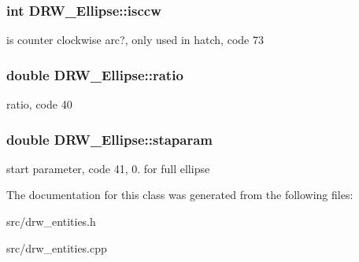 \subsubsection[{isccw}]{\setlength{\rightskip}{0pt plus 5cm}int D\+R\+W\+\_\+\+Ellipse\+::isccw}\label{class_d_r_w___ellipse_a6a8cd9de5c300fde3c52c26daf66ac77}
is counter clockwise arc?, only used in hatch, code 73 \hypertarget{class_d_r_w___ellipse_a5f99577d5e97fa8e0d308a2ab52a2f95}{}
\subsubsection[{ratio}]{\setlength{\rightskip}{0pt plus 5cm}double D\+R\+W\+\_\+\+Ellipse\+::ratio}\label{class_d_r_w___ellipse_a5f99577d5e97fa8e0d308a2ab52a2f95}
ratio, code 40 \hypertarget{class_d_r_w___ellipse_a8b9ca88b1d30755bdaa2de0e11116ede}{}
\subsubsection[{staparam}]{\setlength{\rightskip}{0pt plus 5cm}double D\+R\+W\+\_\+\+Ellipse\+::staparam}\label{class_d_r_w___ellipse_a8b9ca88b1d30755bdaa2de0e11116ede}
start parameter, code 41, 0. for full ellipse 

The documentation for this class was generated from the following files\+:\begin{DoxyCompactItemize}
\item 
src/drw\+\_\+entities.\+h\item 
src/drw\+\_\+entities.\+cpp\end{DoxyCompactItemize}
